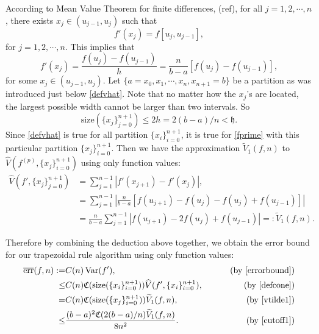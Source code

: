 \documentclass[draft]{iitthesis}
\DeclareMathOperator{\Var}{Var}
\theoremstyle{definition}
\theoremstyle{remark}
\begin{document}
According to Mean Value Theorem for finite differences, (ref), for all $j=1,2,\cdots,n$, there exists $x_j\in (u_{j-1},u_{j})$ such that
\begin{equation*}
   f'(x_j)= f[u_{j},u_{j-1}],
\end{equation*}
for $j = 1, 2, \cdots, n.$ This implies that
\begin{equation}\label{fprime}
  f'(x_j)=\frac{f(u_{j})-f(u_{j-1})}{h}=\frac{n}{b-a}[f(u_{j})-f(u_{j-1})],
\end{equation}
for some $x_j\in (u_{j-1},u_{j})$. Let $\{a=x_{0}, x_{1},\cdots,x_{n},x_{n+1}=b\}$ be a partition as was introduced just below \eqref{defvhat}. Note that no matter how the $x_j$'s are located, the largest possible width cannot be larger than two intervals. So
\begin{equation}\label{cutoff1}
  \text{size}(\{x_j\}_{j=0}^{n+1})\leq 2h=2(b-a)/n<\mathfrak{h}.
\end{equation}
Since \eqref{defvhat} is true for all partition $\{x_i\}_{i=0}^{n+1}$, it is true for \eqref{fprime} with this particular partition $\{x_j\}_{i=0}^{n+1}$. Then we have the approximation $\widetilde{V}_1(f,n)$ to $\widehat{V}(f^{(p)},\{x_j\}_{i=0}^{n+1})$ using only function values:
\begin{align}\label{vtilde1}
\nonumber    \widehat{V}(f',\{x_j\}_{j=0}^{n+1})&= \sum_{j=1}^{n-1}\left|f'(x_{j+1})-f'(x_{j})\right|,\\
\nonumber    &=\sum_{j=1}^{n-1}\left|\frac{n}{b-a}[f(u_{j+1})-f(u_{j})-f(u_{j})+f(u_{j-1})]\right|\\
    &=\frac{n}{b-a}\sum_{j=1}^{n-1}\left|f(u_{j+1})-2f(u_{j})+f(u_{j-1})\right|=:\widetilde{V}_1(f,n).
\end{align}

Therefore by combining the deduction above together, we obtain the error bound for our trapezoidal rule algorithm using only function values:
\begin{align*}
\overline{\text{err}}(f,n):=&C(n)\Var(f'),\qquad &\text{ (by \eqref{errorbound})}\\
\leq & C(n)\mathfrak{C}(\text{size}(\{x_i\}_{i=0}^{n+1}))\widehat{V}(f',\{x_i\}_{i=0}^{n+1}), \qquad &\text{ (by \eqref{defcone})}\\
=& C(n)\mathfrak{C}(\text{size}(\{x_j\}_{i=0}^{n+1}))\widetilde{V}_1(f,n), \qquad &\text{ (by \eqref{vtilde1})}\\
  \leq & \frac{(b-a)^2\mathfrak{C}(2(b-a)/n)\widetilde{V}_1(f,n)}{8n^2}.\qquad &\text{ (by \eqref{cutoff1})}
\end{align*}
\end{document}
